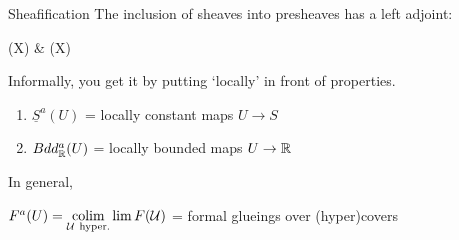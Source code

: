 \begin{frame}{Sheafification}
	The inclusion of sheaves into presheaves has a left adjoint:
	\begin{diagram*}
		\Sh(X)  \& \Psh(X) 
	\end{diagram*}
	Informally, you get it by putting `locally' in front of properties.
	\onslide<2->\begin{example}
		\begin{enumerate}
			\item %
				$\underline S^a(U)$ = {\color{red}locally} constant maps $U \to S$ 
			\item
				$Bdd^a_{\mathbb{R}}(U)$ = {\color{red}locally} bounded maps $U \to \mathbb{R}$
		\end{enumerate}
	\end{example}
	In general,
	\begin{center}
		$F^a(U) = {\displaystyle \operatorname*{colim}_{\mathcal{U}\ \text{hyper.}} \lim F(\mathcal{U})}$ = formal glueings over (hyper)covers
	\end{center}
\end{frame}
